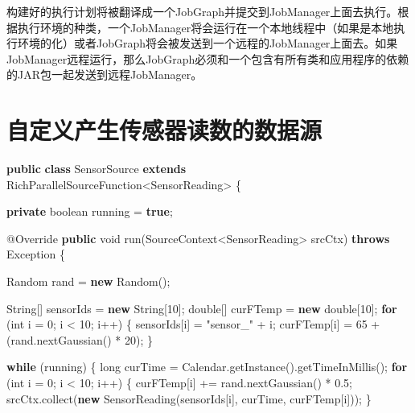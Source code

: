 \documentclass[cn,11pt,chinese]{elegantbook}
\newenvironment{Shaded}{}{}
\newcommand{\AttributeTok}[1]{\textcolor[rgb]{0.49,0.56,0.16}{#1}}
\newcommand{\BuiltInTok}[1]{#1}
\newcommand{\DataTypeTok}[1]{\textcolor[rgb]{0.56,0.13,0.00}{#1}}
\newcommand{\DecValTok}[1]{\textcolor[rgb]{0.25,0.63,0.44}{#1}}
\newcommand{\FloatTok}[1]{\textcolor[rgb]{0.25,0.63,0.44}{#1}}
\newcommand{\FunctionTok}[1]{\textcolor[rgb]{0.02,0.16,0.49}{#1}}
\newcommand{\KeywordTok}[1]{\textcolor[rgb]{0.00,0.44,0.13}{\textbf{#1}}}
\newcommand{\NormalTok}[1]{#1}
\newcommand{\StringTok}[1]{\textcolor[rgb]{0.25,0.44,0.63}{#1}}
\begin{document}
构建好的执行计划将被翻译成一个JobGraph并提交到JobManager上面去执行。根据执行环境的种类，一个JobManager将会运行在一个本地线程中（如果是本地执行环境的化）或者JobGraph将会被发送到一个远程的JobManager上面去。如果JobManager远程运行，那么JobGraph必须和一个包含有所有类和应用程序的依赖的JAR包一起发送到远程JobManager。

\hypertarget{ux81eaux5b9aux4e49ux4ea7ux751fux4f20ux611fux5668ux8bfbux6570ux7684ux6570ux636eux6e90}{%
\section{自定义产生传感器读数的数据源}\label{ux81eaux5b9aux4e49ux4ea7ux751fux4f20ux611fux5668ux8bfbux6570ux7684ux6570ux636eux6e90}}

\begin{Shaded}
\begin{Highlighting}[]
\KeywordTok{public} \KeywordTok{class}\NormalTok{ SensorSource }\KeywordTok{extends}\NormalTok{ RichParallelSourceFunction\textless{}SensorReading\textgreater{} \{}

    \KeywordTok{private} \DataTypeTok{boolean}\NormalTok{ running = }\KeywordTok{true}\NormalTok{;}

    \AttributeTok{@Override}
    \KeywordTok{public} \DataTypeTok{void} \FunctionTok{run}\NormalTok{(SourceContext\textless{}SensorReading\textgreater{} srcCtx) }\KeywordTok{throws} \BuiltInTok{Exception}\NormalTok{ \{}

        \BuiltInTok{Random}\NormalTok{ rand = }\KeywordTok{new} \BuiltInTok{Random}\NormalTok{();}

        \BuiltInTok{String}\NormalTok{[] sensorIds = }\KeywordTok{new} \BuiltInTok{String}\NormalTok{[}\DecValTok{10}\NormalTok{];}
        \DataTypeTok{double}\NormalTok{[] curFTemp = }\KeywordTok{new} \DataTypeTok{double}\NormalTok{[}\DecValTok{10}\NormalTok{];}
        \KeywordTok{for}\NormalTok{ (}\DataTypeTok{int}\NormalTok{ i = }\DecValTok{0}\NormalTok{; i \textless{} }\DecValTok{10}\NormalTok{; i++) \{}
\NormalTok{            sensorIds[i] = }\StringTok{"sensor\_"}\NormalTok{ + i;}
\NormalTok{            curFTemp[i] = }\DecValTok{65}\NormalTok{ + (rand.}\FunctionTok{nextGaussian}\NormalTok{() * }\DecValTok{20}\NormalTok{);}
\NormalTok{        \}}

        \KeywordTok{while}\NormalTok{ (running) \{}
            \DataTypeTok{long}\NormalTok{ curTime = }\BuiltInTok{Calendar}\NormalTok{.}\FunctionTok{getInstance}\NormalTok{().}\FunctionTok{getTimeInMillis}\NormalTok{();}
            \KeywordTok{for}\NormalTok{ (}\DataTypeTok{int}\NormalTok{ i = }\DecValTok{0}\NormalTok{; i \textless{} }\DecValTok{10}\NormalTok{; i++) \{}
\NormalTok{                curFTemp[i] += rand.}\FunctionTok{nextGaussian}\NormalTok{() * }\FloatTok{0.}\DecValTok{5}\NormalTok{;}
\NormalTok{                srcCtx.}\FunctionTok{collect}\NormalTok{(}\KeywordTok{new} \FunctionTok{SensorReading}\NormalTok{(sensorIds[i], curTime, curFTemp[i]));}
\NormalTok{            \}}


\end{Highlighting}
\end{Shaded}
\end{document}
